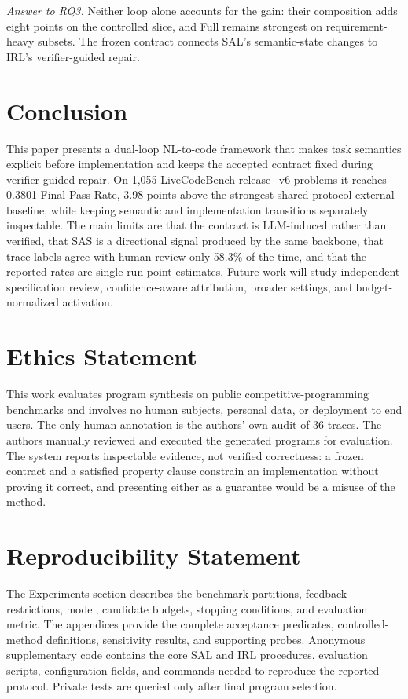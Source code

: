 \documentclass{article}
\begin{document}
\noindent\textit{Answer to RQ3.}
Neither loop alone accounts for the gain: their composition adds eight points on the controlled slice, and Full remains strongest on requirement-heavy subsets. The frozen contract connects SAL's semantic-state changes to IRL's verifier-guided repair.



\section{Conclusion}

This paper presents a dual-loop NL-to-code framework that makes task semantics explicit before implementation and keeps the accepted contract fixed during verifier-guided repair. On 1,055 LiveCodeBench release\_v6 problems it reaches 0.3801 Final Pass Rate, 3.98 points above the strongest shared-protocol external baseline, while keeping semantic and implementation transitions separately inspectable. The main limits are that the contract is LLM-induced rather than verified, that SAS is a directional signal produced by the same backbone, that trace labels agree with human review only 58.3\% of the time, and that the reported rates are single-run point estimates. Future work will study independent specification review, confidence-aware attribution, broader settings, and budget-normalized activation.

\section*{Ethics Statement}

This work evaluates program synthesis on public competitive-programming benchmarks and involves no human subjects, personal data, or deployment to end users. The only human annotation is the authors' own audit of 36 traces. The authors manually reviewed and executed the generated programs for evaluation. The system reports inspectable evidence, not verified correctness: a frozen contract and a satisfied property clause constrain an implementation without proving it correct, and presenting either as a guarantee would be a misuse of the method.

\section*{Reproducibility Statement}

The Experiments section describes the benchmark partitions, feedback restrictions, model, candidate budgets, stopping conditions, and evaluation metric. The appendices provide the complete acceptance predicates, controlled-method definitions, sensitivity results, and supporting probes. Anonymous supplementary code contains the core SAL and IRL procedures, evaluation scripts, configuration fields, and commands needed to reproduce the reported protocol. Private tests are queried only after final program selection.
\end{document}
